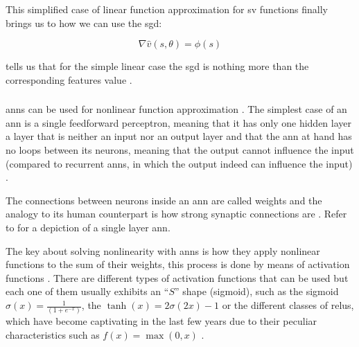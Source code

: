 This simplified case of linear function approximation for \gls{sv} functions finally brings us to how we can use the \gls{sgd}:

\begin{equation}
\label{eq:sgd_linear}
	\nabla \hat{v} (s,\theta) = \phi (s)
\end{equation}

 tells us that for the simple linear case the \gls{sgd} is nothing more than the corresponding features value  \citep[p. 199]{Sutton2017}.

\subsubsection{}
\label{subsubsec:ann_theory}

\glspl{ann} can be used for nonlinear function approximation \citep[p. 199]{Sutton2017}. The simplest case of an \gls{ann} is a single feedforward perceptron, meaning that it has only one hidden layer \ie a layer that is neither an input nor an output layer and that the \gls{ann} at hand has no loops between its neurons, meaning that the output cannot influence the input (compared to recurrent \glspl{ann}, in which the output indeed can influence the input) \citep[p. 216]{Sutton2017}. 

The connections between neurons inside an \gls{ann} are called weights and the analogy to its human counterpart is how strong synaptic connections are \citep[p. 216]{Sutton2017}. Refer to  for a depiction of a single layer \gls{ann}.

The key about solving nonlinearity with \glspl{ann} is how they apply nonlinear functions to the sum of their weights, this process is done by means of activation functions \citep[p. 216]{Sutton2017}. There are different types of activation functions that can be used but each one of them usually exhibits an ``$S$'' shape (\ie sigmoid), such as the sigmoid $\sigma(x) = \frac{1}{(1+e^{-x})}$, the $\tanh(x) = 2\sigma(2x)-1$ or the different classes of \glspl{relu}, which have become captivating in the last few years due to their peculiar characteristics such as $f(x) = \max(0,x)$ \citep[p. 216]{Sutton2017}.



